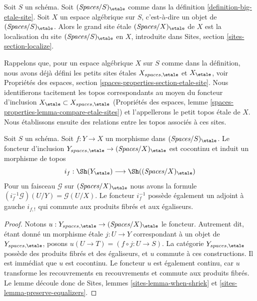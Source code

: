 \begin{definition}
\label{definition-big-small-etale}
Soit $S$ un schéma. Soit $(\textit{Spaces}/S)_\etale$ comme dans
la définition \ref{definition-big-etale-site}.
Soit $X$ un espace algébrique sur $S$, c'est-à-dire un objet de
$(\textit{Spaces}/S)_\etale$. Alors le grand site \'etale
{\it $(\textit{Spaces}/X)_\etale$} de $X$
est la localisation du site $(\textit{Spaces}/S)_\etale$
en $X$, introduite dans Sites, section \ref{sites-section-localize}.
\end{definition}

\noindent
Rappelons que, pour un espace algébrique $X$ sur $S$ comme dans
la définition, nous avons déjà défini les petits sites \'etales
$X_{spaces, \etale}$ et $X_\etale$, voir
Propriétés des espaces, section \ref{spaces-properties-section-etale-site}.
Nous identifierons tacitement les topos correspondants au moyen du
foncteur d'inclusion $X_\etale \subset X_{spaces, \etale}$
(Propriétés des espaces, lemme \ref{spaces-properties-lemma-compare-etale-sites})
et l'appellerons le petit topos \'etale de $X$.
Nous établissons ensuite des relations entre les topos
associés à ces sites.

\begin{lemma}
\label{lemma-put-in-T-etale}
Soit $S$ un schéma. Soit $f : Y \to X$ un morphisme dans
$(\textit{Spaces}/S)_\etale$. Le foncteur d'inclusion
$Y_{spaces, \etale} \to (\textit{Spaces}/X)_\etale$
est cocontinu et induit un morphisme de topos
$$
i_f :
\Sh(Y_\etale)
\longrightarrow
\Sh((\textit{Spaces}/X)_\etale)
$$
Pour un faisceau $\mathcal{G}$ sur $(\textit{Spaces}/X)_\etale$
nous avons la formule $(i_f^{-1}\mathcal{G})(U/Y) = \mathcal{G}(U/X)$.
Le foncteur $i_f^{-1}$ possède également un adjoint à gauche $i_{f, !}$ qui commute
aux produits fibrés et aux égaliseurs.
\end{lemma}

\begin{proof}
Notons $u : Y_{spaces, \etale} \to (\textit{Spaces}/X)_\etale$ le foncteur.
Autrement dit, étant donné un morphisme \'etale $j : U \to Y$ correspondant
à un objet de $Y_{spaces, \etale}$, posons
$u(U \to T) = (f \circ j : U \to S)$.
La catégorie $Y_{spaces, \etale}$
possède des produits fibrés et des égaliseurs, et $u$ commute à ces constructions.
Il est immédiat que $u$ est cocontinu.
Le foncteur $u$ est également continu, car $u$ transforme les recouvrements en recouvrements et
commute aux produits fibrés. Le lemme découle donc de
Sites, lemmes \ref{sites-lemma-when-shriek}
et \ref{sites-lemma-preserve-equalizers}.
\end{proof}

